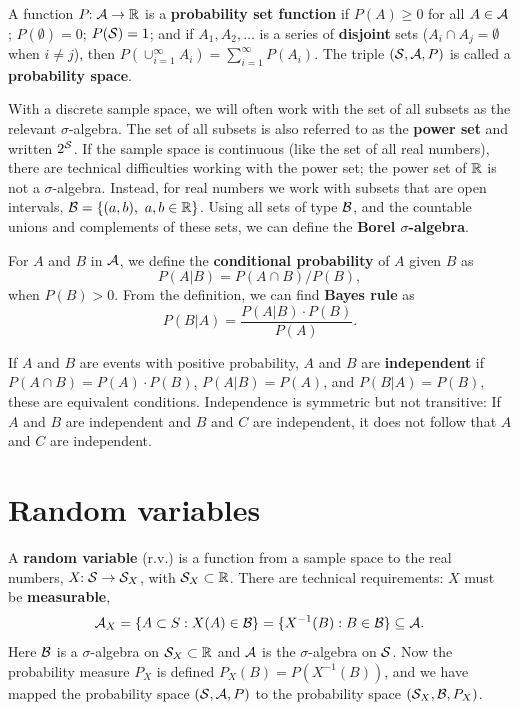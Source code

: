 \documentclass[10pt]{article}
\begin{document}
A function $P\!\!:\mathcal{A} \rightarrow \mathbb{R}$ is a \textbf{probability set function}  if $P(A)\geq0$ for
all $A\in\mathcal{A}$; $P(\emptyset)=0$; $P(\mathcal{S})=1$; and if $A_1,A_2,\dots$ is a
series of \textbf{disjoint} sets ($A_i\cap A_j=\emptyset$ when $i\neq j$), then
$P(\cup_{i=1}^\infty A_i)=\sum_{i=1}^\infty P(A_i)$. The triple
$(\mathcal{S},\mathcal{A},P)$ is called a \textbf{probability space}.

With a discrete sample space, we will often work with the set of all subsets as
the relevant $\sigma$-algebra. The set of all subsets is also referred to as the
\textbf{power set} and written $2^{\mathcal{S}}$. If the sample space is continuous
(like the set of all real numbers), there are technical difficulties working
with the power set; the power set of $\mathbb{R}$ is not a $\sigma$-algebra. Instead,
for real numbers we work with subsets that are open intervals, $\mathcal{B} = \{(a,b),
\ a,b\in\mathbb{R}\}$. Using all sets of type $\mathcal{B}$, and the countable unions and
complements of these sets, we can define the \textbf{Borel $\sigma$-algebra}.

For $A$ and $B$ in $\mathcal{A}$, we define the \textbf{conditional probability} of $A$ given $B$
as \[ P(A|B) = P(A\cap B)/P(B),\] when $P(B)>0$. From the definition, we can find 
\textbf{Bayes rule}
as 
\[ P(B|A) = \frac{ P(A|B)\cdot P(B)}{P(A)}.\]

If $A$ and $B$ are events with positive probability, $A$ and $B$ are \textbf{independent} if
$P(A\cap B) = P(A)\cdot P(B)$, $P(A|B)=P(A)$, and $P(B|A)=P(B)$, these are equivalent
conditions. Independence
is symmetric but not transitive: If $A$ and $B$ are independent and $B$ and $C$ are independent,
it does not follow that $A$ and $C$ are independent.

\section{Random variables}

A \textbf{random variable}  (r.v.) is a function from a sample space to the real numbers,
$X\!\!: \mathcal{S} \rightarrow \mathcal{S}_X$, with $\mathcal{S}_X\subset \mathbb{R}$. There are technical requirements:
$X$ must be \textbf{measurable},
\[ \mathcal{A}_X = \{A\subset S: X(A) \in \mathcal{B}\} = \{X^{-1}(B): B\in \mathcal{B}\}\subseteq \mathcal{A}.\]
Here $\mathcal{B}$ is a $\sigma$-algebra on $\mathcal{S}_X\subset\mathbb{R}$ and $\mathcal{A}$ is the $\sigma$-algebra on $\mathcal{S}$.
Now the probability measure $P_X$ is defined $P_X(B) = P(X^{-1}(B))$, and we have mapped
the probability space $(\mathcal{S},\mathcal{A},P)$ to the probability space $(\mathcal{S}_X,\mathcal{B},P_X)$.
\end{document}
